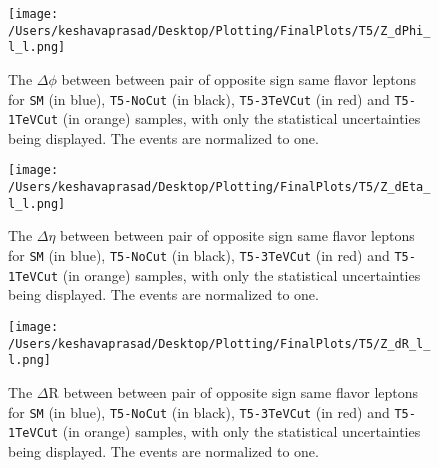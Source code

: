 \begin{figure}[!h]%
	\centering
	\texttt{[image: /Users/keshavaprasad/Desktop/Plotting/FinalPlots/T5/Z\_dPhi\_l\_l.png]}
	\caption{The $\Delta\phi$ between between pair of opposite sign same flavor leptons for \texttt{SM} (in blue), \texttt{T5-NoCut} (in black), \texttt{T5-3TeVCut} (in red) and \texttt{T5-1TeVCut} (in orange) samples, with only the statistical uncertainties being displayed. The events are normalized to one.}
	\label{T5-ZleplepdPhi-PostCuts}
\end{figure}

\begin{figure}[!h]%
	\centering
	\texttt{[image: /Users/keshavaprasad/Desktop/Plotting/FinalPlots/T5/Z\_dEta\_l\_l.png]}
	\caption{The $\Delta\eta$ between between pair of opposite sign same flavor leptons for \texttt{SM} (in blue), \texttt{T5-NoCut} (in black), \texttt{T5-3TeVCut} (in red) and \texttt{T5-1TeVCut} (in orange) samples, with only the statistical uncertainties being displayed. The events are normalized to one.}
	\label{T5-ZleplepdEta-PostCuts}
\end{figure}

\begin{figure}[!h]%
	\centering
	\texttt{[image: /Users/keshavaprasad/Desktop/Plotting/FinalPlots/T5/Z\_dR\_l\_l.png]}
	\caption{The $\Delta \text{R}$ between between pair of opposite sign same flavor leptons for \texttt{SM} (in blue), \texttt{T5-NoCut} (in black), \texttt{T5-3TeVCut} (in red) and \texttt{T5-1TeVCut} (in orange) samples, with only the statistical uncertainties being displayed. The events are normalized to one.}
	\label{T5-Z-dR-PostCuts}
\end{figure}
